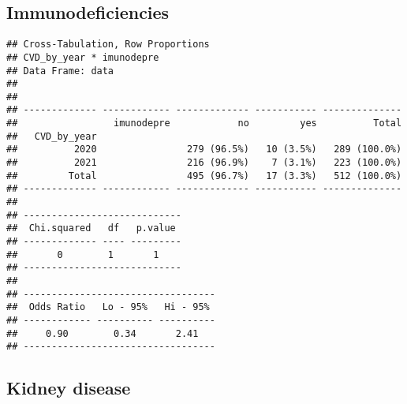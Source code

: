 \documentclass[
]{article}
\newenvironment{Shaded}{\begin{snugshade}}{\end{snugshade}}
\newcommand{\AttributeTok}[1]{\textcolor[rgb]{0.13,0.29,0.53}{#1}}
\newcommand{\ConstantTok}[1]{\textcolor[rgb]{0.56,0.35,0.01}{#1}}
\newcommand{\FunctionTok}[1]{\textcolor[rgb]{0.13,0.29,0.53}{\textbf{#1}}}
\newcommand{\NormalTok}[1]{#1}
\newcommand{\SpecialCharTok}[1]{\textcolor[rgb]{0.81,0.36,0.00}{\textbf{#1}}}
\newcommand{\StringTok}[1]{\textcolor[rgb]{0.31,0.60,0.02}{#1}}
\begin{document}
\hypertarget{immunodeficiencies}{%
\subsection{Immunodeficiencies}\label{immunodeficiencies}}

\begin{Shaded}
\end{Shaded}

\begin{verbatim}
## Cross-Tabulation, Row Proportions  
## CVD_by_year * imunodepre  
## Data Frame: data  
## 
## 
## ------------- ------------ ------------- ----------- --------------
##                 imunodepre            no         yes          Total
##   CVD_by_year                                                      
##          2020                279 (96.5%)   10 (3.5%)   289 (100.0%)
##          2021                216 (96.9%)    7 (3.1%)   223 (100.0%)
##         Total                495 (96.7%)   17 (3.3%)   512 (100.0%)
## ------------- ------------ ------------- ----------- --------------
## 
## ----------------------------
##  Chi.squared   df   p.value 
## ------------- ---- ---------
##       0        1       1    
## ----------------------------
## 
## ----------------------------------
##  Odds Ratio   Lo - 95%   Hi - 95% 
## ------------ ---------- ----------
##     0.90        0.34       2.41   
## ----------------------------------
\end{verbatim}

\hypertarget{kidney-disease}{%
\subsection{Kidney disease}\label{kidney-disease}}

\begin{Shaded}
\end{Shaded}
\end{document}
